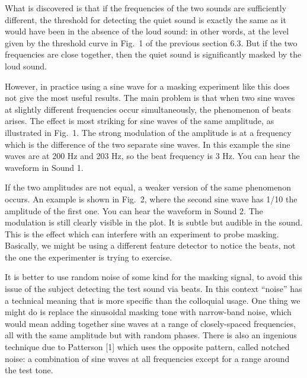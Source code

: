   What is discovered is that if the frequencies of the two sounds are 
  sufficiently different, the threshold for detecting the quiet sound is 
  exactly the same as it would have been in the absence of the loud sound: in 
  other words, at the level given by the threshold curve in Fig.\ 1 of the 
  previous section 6.3. But if the two frequencies are close together, then the 
  quiet sound is significantly masked by the loud sound. 

  However, in practice using a sine wave for a masking experiment like this 
  does not give the most useful results. The main problem is that when two sine 
  waves at slightly different frequencies occur simultaneously, the phenomenon 
  of beats arises. The effect is most striking for sine waves of the same 
  amplitude, as illustrated in Fig.\ 1. The strong modulation of the amplitude 
  is at a frequency which is the difference of the two separate sine waves. In 
  this example the sine waves are at 200 Hz and 203 Hz, so the beat frequency 
  is 3 Hz. You can hear the waveform in Sound 1. 


  If the two amplitudes are not equal, a weaker version of the same phenomenon 
  occurs. An example is shown in Fig.\ 2, where the second sine wave has 1/10 
  the amplitude of the first one. You can hear the waveform in Sound 2. The 
  modulation is still clearly visible in the plot. It is subtle but audible in 
  the sound. This is the effect which can interfere with an experiment to probe 
  masking. Basically, we might be using a different feature detector to notice 
  the beats, not the one the experimenter is trying to exercise. 


  It is better to use random noise of some kind for the masking signal, to 
  avoid this issue of the subject detecting the test sound via beats. In this 
  context ``noise'' has a technical meaning that is more specific than the 
  colloquial usage. One thing we might do is replace the sinusoidal masking 
  tone with narrow-band noise, which would mean adding together sine waves at a 
  range of closely-spaced frequencies, all with the same amplitude but with 
  random phases. There is also an ingenious technique due to Patterson [1] 
  which uses the opposite pattern, called notched noise: a combination of sine 
  waves at all frequencies except for a range around the test tone. 

